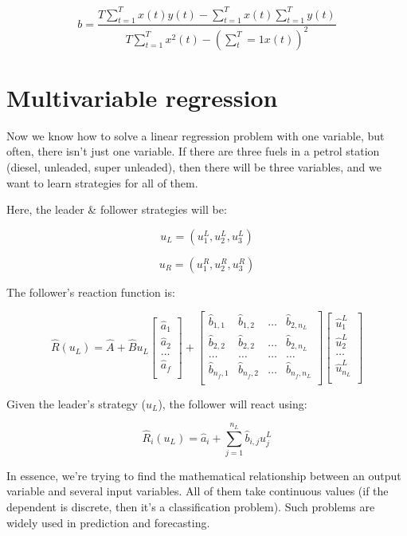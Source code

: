 \[
  b = \frac{
    T\sum^T_{t=1}x(t)y(t) - \sum^T_{t=1}x(t)\sum^T_{t=1}y(t)
  }{
    T\sum^T_{t=1}x^2(t) - (\sum^T_t{=1}x(t))^2
  }
\]


\section{Multivariable regression}

Now we know how to solve a linear regression problem with one variable, but
often, there isn't just one variable. If there are three fuels in a petrol
station (diesel, unleaded, super unleaded), then there will be three variables,
and we want to learn strategies for all of them.

Here, the leader \& follower strategies will be:

\[
  u_L = (u^L_1, u^L_2, u^L_3)
\]

\[
  u_R = (u^R_1, u^R_2, u^R_3)
\]

The follower's reaction function is:

\[
\hat{R}(u_L) = \hat{A} + \hat{B} u_L
  \begin{bmatrix}
    \hat{a}_1\\
    \hat{a}_2\\
    \dots\\
    \hat{a}_f\\
  \end{bmatrix}
  +
  \begin{bmatrix}
    \hat{b}_{1,1}& \hat{b}_{1,2} & \dots & \hat{b}_{2,n_L}\\
    \hat{b}_{2,2}& \hat{b}_{2,2} & \dots & \hat{b}_{2,n_L}\\
    \dots & \dots & \dots & \dots\\
    \hat{b}_{n_f,1} & \hat{b}_{n_f,2} & \dots & \hat{b}_{n_f,n_L}\\
  \end{bmatrix}
  \begin{bmatrix}
    \hat{u}_1^L\\
    \hat{u}_2^L\\
    \dots\\
    \hat{u}_{n_L}^L\\
  \end{bmatrix}
\]

Given the leader's strategy ($u_L$), the follower will react using:

\[
  \hat{R}_i(u_L) = \hat{a}_i + \sum^{n_L}_{j=1}\hat{b}_{i,j}u^L_{j}
\]

In essence, we're trying to find the mathematical relationship between an output
variable and several input variables. All of them take continuous values (if the
dependent is discrete, then it's a classification problem). Such problems are
widely used in prediction and forecasting.

